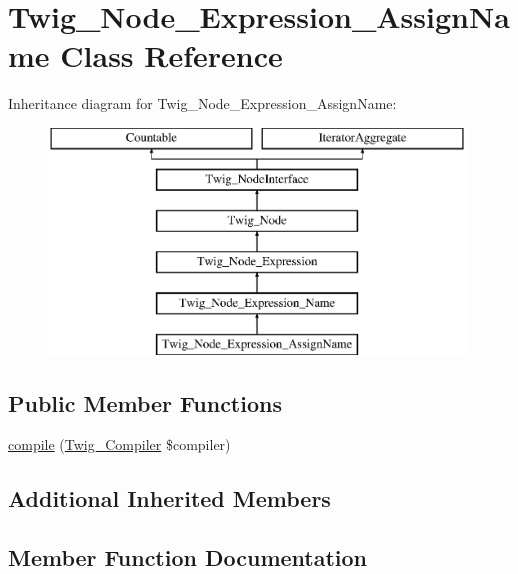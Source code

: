 \hypertarget{classTwig__Node__Expression__AssignName}{}\section{Twig\+\_\+\+Node\+\_\+\+Expression\+\_\+\+Assign\+Name Class Reference}
\label{classTwig__Node__Expression__AssignName}
Inheritance diagram for Twig\+\_\+\+Node\+\_\+\+Expression\+\_\+\+Assign\+Name\+:\begin{figure}[H]
\begin{center}
\leavevmode
\includegraphics[height=6.000000cm]{classTwig__Node__Expression__AssignName}
\end{center}
\end{figure}
\subsection*{Public Member Functions}
\begin{DoxyCompactItemize}
\item 
\hyperlink{classTwig__Node__Expression__AssignName_a930471c6aab9b62bfcfb5ff20d99cdc5}{compile} (\hyperlink{classTwig__Compiler}{Twig\+\_\+\+Compiler} \$compiler)
\end{DoxyCompactItemize}
\subsection*{Additional Inherited Members}


\subsection{Member Function Documentation}

